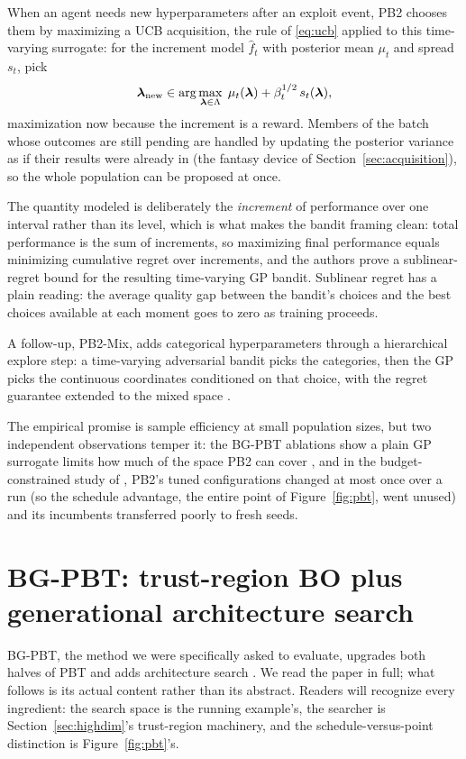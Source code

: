 When an agent needs new hyperparameters after an exploit event, PB2
chooses them by maximizing a UCB acquisition, the rule of
\eqref{eq:ucb} applied to this time-varying surrogate: for the increment
model $\hat{f}_t$ with posterior mean $\mu_t$ and spread $s_t$, pick
\begin{equation}
\bm{\lambda}_{\mathrm{new}}
\in \arg\max_{\bm{\lambda} \in \Lambda}\;
\mu_t(\bm{\lambda}) + \beta_t^{1/2}\, s_t(\bm{\lambda}),
\label{eq:pb2}
\end{equation}
maximization now because the increment is a reward. Members of the batch
whose outcomes are still pending are handled by updating the posterior
variance as if their results were already in (the fantasy device of
Section~\ref{sec:acquisition}), so the whole population can be proposed
at once.

The quantity modeled is deliberately the \emph{increment} of
performance over one interval rather than its level, which is what makes
the bandit framing clean: total performance is the sum of increments, so
maximizing final performance equals minimizing cumulative regret over
increments, and the authors prove a sublinear-regret bound for the
resulting time-varying GP bandit. Sublinear regret has a plain reading:
the average quality gap between the bandit's choices and the best
choices available at each moment goes to zero as training proceeds.

A follow-up, PB2-Mix, adds categorical hyperparameters through a
hierarchical explore step: a time-varying adversarial bandit picks the
categories, then the GP picks the continuous coordinates conditioned on
that choice, with the regret guarantee extended to the mixed space
\citep{parkerholder2021pb2mix}.

The empirical promise is sample
efficiency at small population sizes, but two independent observations
temper it: the BG-PBT ablations show a plain GP surrogate limits how much
of the space PB2 can cover \citep{wan2022bgpbt}, and in the
budget-constrained study of \citet{eimer2023hyperparameters}, PB2's tuned
configurations changed at most once over a run (so the schedule
advantage, the entire point of Figure~\ref{fig:pbt}, went unused) and its
incumbents transferred poorly to fresh seeds.

\section{BG-PBT: trust-region BO plus generational architecture search}

BG-PBT, the method we were specifically asked to evaluate, upgrades both
halves of PBT and adds architecture search \citep{wan2022bgpbt}. We read
the paper in full; what follows is its actual content rather than its
abstract. Readers will recognize every ingredient: the search space is
the running example's, the searcher is Section~\ref{sec:highdim}'s
trust-region machinery, and the schedule-versus-point distinction is
Figure~\ref{fig:pbt}'s.

